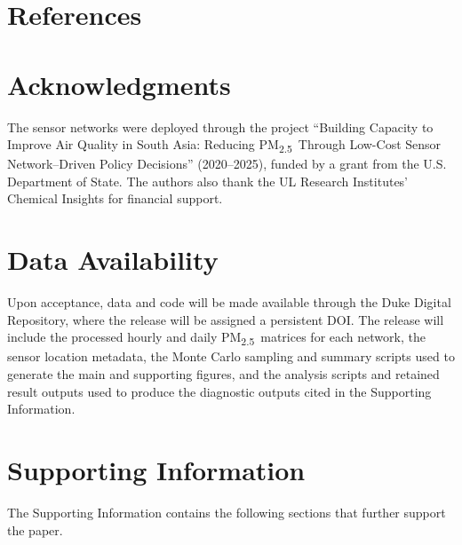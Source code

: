\documentclass[12pt]{article}
\theoremstyle{remark}
\newcommand{\pmtt}{\textrm{PM\textsubscript{2.5}}}
\begin{document}
\section*{References} \label{sec:bibliography}
\printbibliography[heading=none]

\clearpage
\section*{Acknowledgments}
The sensor networks were deployed through the project “Building Capacity to Improve Air Quality in South Asia: Reducing \pmtt\ Through Low-Cost Sensor Network--Driven Policy Decisions” (2020--2025), funded by a grant from the U.S. Department of State. The authors also thank the UL Research Institutes' Chemical Insights for financial support.

\section*{Data Availability}
\label{app:data}
Upon acceptance, data and code will be made available through the Duke Digital Repository, where the release will be assigned a persistent DOI. The release will include the processed hourly and daily \pmtt\ matrices for each network, the sensor location metadata, the Monte Carlo sampling and summary scripts used to generate the main and supporting figures, and the analysis scripts and retained result outputs used to produce the diagnostic outputs cited in the Supporting Information.

\section*{Supporting Information}\label{sec:SI_details}
The Supporting Information contains the following sections that further support the paper.
\end{document}
